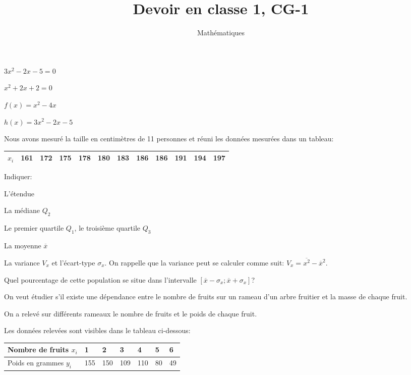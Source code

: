 \documentclass[a4paper,12pt]{scrartcl}
\date{}
\title{Devoir en classe 1, CG-1}
\author{Mathématiques}
\begin{document}
\maketitle


\question{}
$3x^2-2x-5=0$

\question{}
$x^2+2x+2=0$


\question{}
$f(x) = x^2 - 4x$

\question{}
$h(x) = 3x^2-2x-5$


Nous avons mesuré la taille en centimètres de 11 personnes et réuni les données mesurées dans un tableau:

\begin{center}
\begin{tabular}{|l|l|l|l|l|l|l|l|l|l|l|l|}
\hline
$x_i$ & 161 & 172 & 175 & 178 & 180 & 183 & 186 & 186 & 191 & 194 & 197 \\ \hline
\end{tabular}
\end{center}

Indiquer:

\question{}
L'étendue

\question{}
La médiane $Q_2$

\question{}
Le premier quartile $Q_1$, le troisième quartile $Q_3$

\question{}
La moyenne $\overline{x}$

\question{}
La variance $V_x$ et l'écart-type $\sigma_x$. On rappelle que la variance peut se calculer comme suit: $V_x = \overline{x^2} - \overline{x}^2$.

\question{}
Quel pourcentage de cette population se situe dans l'intervalle $[\overline{x} - \sigma_x ; \overline{x} + \sigma_x]$?


On veut étudier s'il existe une dépendance entre le nombre de fruits sur un rameau d'un arbre fruitier et la masse de chaque fruit. 

On a relevé sur différents rameaux le nombre de fruits et le poids de chaque fruit. 

Les données relevées sont visibles dans le tableau ci-dessous:

\begin{center}
\begin{tabular}{|l|l|l|l|l|l|l|}
\hline
Nombre de fruits $x_i$       & 1   & 2   & 3   & 4   & 5  & 6  \\ \hline
Poids en grammes $y_i$ & 155 & 150 & 109 & 110 & 80 & 49 \\ \hline
\end{tabular}
\end{center}
\end{document}
